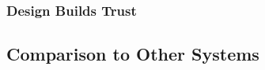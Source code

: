 \documentclass{sigchi}
\begin{document}
\subsubsection{Design Builds Trust}

\subsection{Comparison to Other Systems}



%
\end{document}
